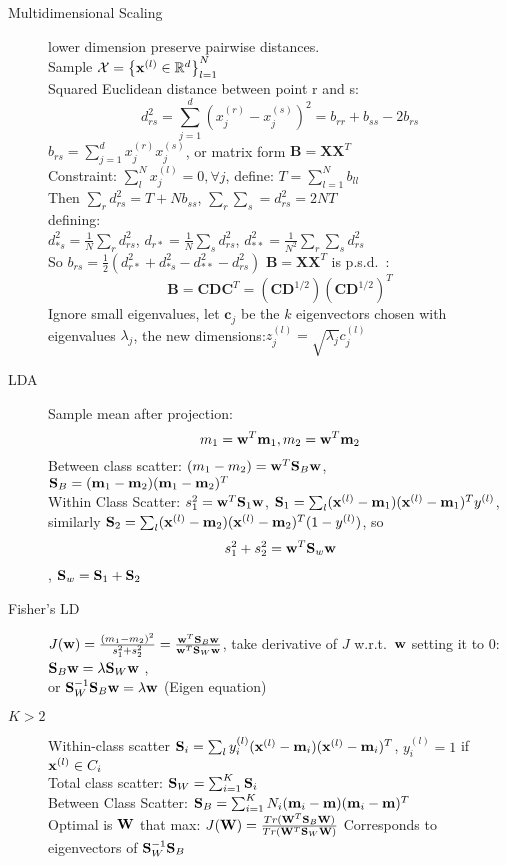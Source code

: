 \begin{description}
    \item[Multidimensional Scaling] lower dimension preserve pairwise distances.
        \\
        Sample $\mathcal{X} = \left\{ \mathbf{x}^{(l)} \in \mathbb{R}^d \right\}^N_{l=1}$\\
        Squared Euclidean distance between point r and s: \[
            d_{rs}^2 = \sum_{j=1}^d(x_j^{(r)}-x_j^{(s)})^2 = b_{rr} +b_{ss}
        -2b_{rs}\]
        $b_{rs} = \sum_{j=1}^d x_j^{(r)}x_j^{(s)}$, or matrix form $\mathbf{B} =
        \mathbf{X}\mathbf{X}^T$\\
        Constraint: $\sum_l^N x_j^{(l)}=0,\forall j$, define:
        $T=\sum_{l=1}^N b_{ll}$\\
        Then $\sum_r d_{rs}^2 = T + N b_{ss}$, $\sum_r\sum_s = d^2_{rs} = 2NT$\\
        defining:\\ $d_{*s}^2 = \frac{1}{N}\sum_r d_{rs}^2$, $d_{r*} =
        \frac{1}{N}\sum_s d_{rs}^2$, $d_{**}^2 = \frac{1}{N^2}\sum_r 
        \sum_s d_{rs}^2$\\
        So $b_{rs} = \frac{1}{2}(d_{r*}^2 + d_{*s}^2 - d_{**}^2 - d_{rs}^2)$
        $\mathbf{B} = \mathbf{XX}^T$ is p.s.d.\ :\[
            \mathbf{B} = \mathbf{CDC}^T =
        (\mathbf{CD}^{1/2})(\mathbf{CD}^{1/2})^T\]
        Ignore small eigenvalues, let $\mathbf{c}_j$ be the $k$ eigenvectors chosen with eigenvalues
        $\lambda_j$, the new dimensions:$z_j^{(l)} = \sqrt{\lambda_j} c_j^{(l)}$
    \item[LDA] Sample mean after projection: 
        \[ m_1 = \mathbf{w}^T \mathbf{m}_1, m_2 = \mathbf{w}^T\mathbf{m}_2 \]
        Between class scatter: $(m_1 - m_2) = \mathbf{w}^T\mathbf{S}_B\mathbf{w}$, $\mathbf{S}_B = (\mathbf{m}_1
        -\mathbf{m}_2)(\mathbf{m}_1 - \mathbf{m}_2)^T$\\
        Within Class Scatter: $s_1^2 = \mathbf{w}^T\mathbf{S}_1 \mathbf{w}$, $\mathbf{S}_1 = \sum_l
        (\mathbf{x}^{(l)}-\mathbf{m}_1)(\mathbf{x}^{(l)}-\mathbf{m}_1)^T y^{(l)}$, similarly $\mathbf{S}_2 = \sum_l (\mathbf{x}^{(l)}
        -\mathbf{m}_2)(\mathbf{x}^{(l)} - \mathbf{m}_2)^T(1-y^{(l)})$, so \[ s_1^2 + s_2^2 =
        \mathbf{w}^T\mathbf{S}_w\mathbf{w}\], $\mathbf{S}_w = \mathbf{S}_1+\mathbf{S}_2$
    \item[Fisher's LD] $J(\mathbf{w}) = \frac{(m_1-m_2)^2}{s_1^2 + s_2^2} =
        \frac{\mathbf{w}^T\mathbf{S}_B\mathbf{w}}{\mathbf{w}^T\mathbf{S}_W\mathbf{w}} $, take derivative of $J$ w.r.t.\
        $\mathbf{w}$ setting it to 0: $\mathbf{S}_B\mathbf{w} = \lambda\mathbf{S}_W\mathbf{w}$ , \\ or
        $\mathbf{S}_W^{-1}\mathbf{S}_B\mathbf{w} = \lambda\mathbf{w}$ (Eigen equation)
    \item[$K > 2$] Within-class scatter
        $\mathbf{S}_i = \sum_l y_i^{(l)}(\mathbf{x}^{(l)} -
        \mathbf{m}_i)(\mathbf{x}^{(l)}-\mathbf{m}_i)^T$, $y_i^{(l)}=1$ if $\mathbf{x}^{(l)}\in C_i$\\
        Total class scatter: $\mathbf{S}_W = \sum_{i=1}^K\mathbf{S}_i$\\
        Between Class Scatter: $\mathbf{S}_B = \sum_{i=1}^K N_i(\mathbf{m}_i - \mathbf{m})(\mathbf{m}_i -
        \mathbf{m})^T$\\
        Optimal is $\mathbf{W}$ that max: $J(\mathbf{W}) = \frac{Tr(\mathbf{W}^T\mathbf{S}_B\mathbf{W})}{Tr(\mathbf{W}^T\mathbf{S}_W\mathbf{W})}$
        Corresponds to eigenvectors of $\mathbf{S}_W^{-1}\mathbf{S}_B$ 
\end{description}
